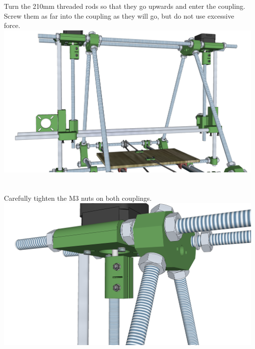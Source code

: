 \documentclass[twoside,a4paper,titlepage]{memoir}
\begin{document}
	\section{}
	Turn the 210mm threaded rods so that they go upwards and enter the coupling. Screw them as far into
	the coupling as they will go, but do not use excessive force.\\
	\includegraphics[width=1\linewidth]{graphics/ch8_21.png}
	
	\section{}
	Carefully tighten the M3 nuts on both couplings.\\
	\includegraphics[width=1\linewidth]{graphics/ch8_22.png}
	
\end{document}
